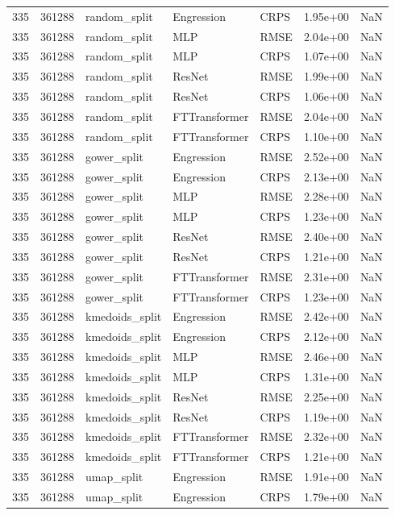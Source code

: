 \begin{tabular}{rrlllrr}
335 & 361288 & random\_split & Engression & CRPS & 1.95e+00 & NaN \\
335 & 361288 & random\_split & MLP & RMSE & 2.04e+00 & NaN \\
335 & 361288 & random\_split & MLP & CRPS & 1.07e+00 & NaN \\
335 & 361288 & random\_split & ResNet & RMSE & 1.99e+00 & NaN \\
335 & 361288 & random\_split & ResNet & CRPS & 1.06e+00 & NaN \\
335 & 361288 & random\_split & FTTransformer & RMSE & 2.04e+00 & NaN \\
335 & 361288 & random\_split & FTTransformer & CRPS & 1.10e+00 & NaN \\
335 & 361288 & gower\_split & Engression & RMSE & 2.52e+00 & NaN \\
335 & 361288 & gower\_split & Engression & CRPS & 2.13e+00 & NaN \\
335 & 361288 & gower\_split & MLP & RMSE & 2.28e+00 & NaN \\
335 & 361288 & gower\_split & MLP & CRPS & 1.23e+00 & NaN \\
335 & 361288 & gower\_split & ResNet & RMSE & 2.40e+00 & NaN \\
335 & 361288 & gower\_split & ResNet & CRPS & 1.21e+00 & NaN \\
335 & 361288 & gower\_split & FTTransformer & RMSE & 2.31e+00 & NaN \\
335 & 361288 & gower\_split & FTTransformer & CRPS & 1.23e+00 & NaN \\
335 & 361288 & kmedoids\_split & Engression & RMSE & 2.42e+00 & NaN \\
335 & 361288 & kmedoids\_split & Engression & CRPS & 2.12e+00 & NaN \\
335 & 361288 & kmedoids\_split & MLP & RMSE & 2.46e+00 & NaN \\
335 & 361288 & kmedoids\_split & MLP & CRPS & 1.31e+00 & NaN \\
335 & 361288 & kmedoids\_split & ResNet & RMSE & 2.25e+00 & NaN \\
335 & 361288 & kmedoids\_split & ResNet & CRPS & 1.19e+00 & NaN \\
335 & 361288 & kmedoids\_split & FTTransformer & RMSE & 2.32e+00 & NaN \\
335 & 361288 & kmedoids\_split & FTTransformer & CRPS & 1.21e+00 & NaN \\
335 & 361288 & umap\_split & Engression & RMSE & 1.91e+00 & NaN \\
335 & 361288 & umap\_split & Engression & CRPS & 1.79e+00 & NaN \\

\end{tabular}
